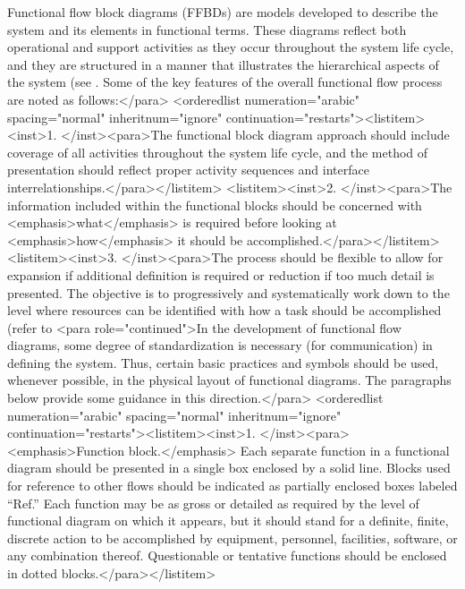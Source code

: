 Functional flow block diagrams (FFBDs) are models developed to describe the system and its elements in functional terms. These diagrams reflect both operational and support activities as they occur throughout the system life cycle, and they are structured in a manner that illustrates the hierarchical aspects of the system (see . Some of the key features of the overall functional flow process are noted as follows:</para>
<orderedlist numeration="arabic" spacing="normal" inheritnum="ignore" continuation="restarts"><listitem><inst>1.	</inst><para>The functional block diagram approach should include coverage of all activities throughout the system life cycle, and the method of presentation should reflect proper activity sequences and interface interrelationships.</para></listitem>
<listitem><inst>2.	</inst><para>The information included within the functional blocks should be concerned with <emphasis>what</emphasis> is required before looking at <emphasis>how</emphasis> it should be accomplished.</para></listitem>
<listitem><inst>3.	</inst><para>The process should be flexible to allow for expansion if additional definition is required or reduction if too much detail is presented. The objective is to progressively and systematically work down to the level where resources can be identified with how a task should be accomplished (refer to 
<para role="continued">In the development of functional flow diagrams, some degree of standardization is necessary (for communication) in defining the system. Thus, certain basic practices and symbols should be used, whenever possible, in the physical layout of functional diagrams. The paragraphs below provide some guidance in this direction.</para>
<orderedlist numeration="arabic" spacing="normal" inheritnum="ignore" continuation="restarts"><listitem><inst>1.	</inst><para><emphasis>Function block.</emphasis> Each separate function in a functional diagram should be presented in a single box enclosed by a solid line. Blocks used for reference to other flows should be indicated as partially enclosed boxes labeled “Ref.” Each function may be as gross or detailed as required by the level of functional diagram on which it appears, but it should stand for a definite, finite, discrete action to be accomplished by equipment, personnel, facilities, software, or any combination thereof. Questionable or tentative functions should be enclosed in dotted blocks.</para></listitem>
